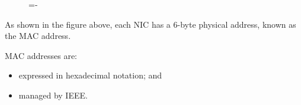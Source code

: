 \documentclass[a4paper]{systems-software}
\begin{document}
\begin{figure}[H]
	\lineskip=-\fboxrule
\end{figure}

As shown in the figure above, each NIC has a 6-byte physical address, known as the MAC address.

MAC addresses are:
\begin{itemize}
	\item expressed in hexadecimal notation; and
	\item managed by IEEE.
\end{itemize}
\end{document}
